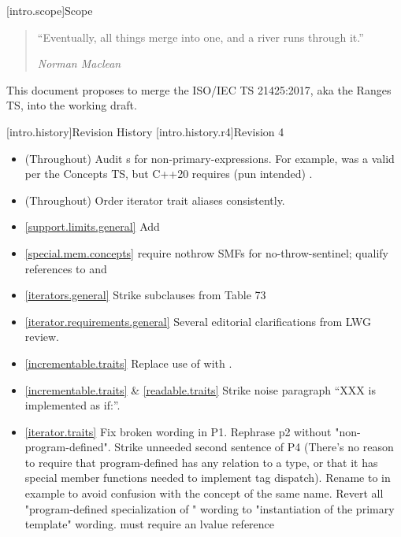 [intro.scope]{Scope}

\begin{quote}
``Eventually, all things merge into one, and a river runs through it.''
\begin{flushright}
\textemdash \textit{Norman Maclean}
\end{flushright}
\end{quote}

\pnum
This document proposes to merge the ISO/IEC TS 21425:2017, aka the Ranges TS,
into the working draft.

[intro.history]{Revision History}
[intro.history.r4]{Revision 4}
\begin{itemize}
\item (Throughout) Audit s for
  non-primary-expressions. For example,  was a valid
   per the Concepts TS, but C++20 requires
  (pun intended) .
\item (Throughout) Order iterator trait aliases consistently.
\item \ref{support.limits.general} Add 
\item \ref{special.mem.concepts} require nothrow SMFs for no-throw-sentinel;
  qualify references to  and 
\item \ref{iterators.general} Strike subclauses from Table 73
\item \ref{iterator.requirements.general} Several editorial clarifications from
  LWG review.
\item \ref{incrementable.traits} Replace use of  with
  .
\item \ref{incrementable.traits} \& \ref{readable.traits} Strike noise paragraph
  ``XXX is implemented as if:''.
\item \ref{iterator.traits} Fix broken wording in P1. Rephrase p2 without
  "non-program-defined". Strike unneeded second sentence of P4
  (There's no reason to require that program-defined 
  has any relation to a  type, or that it has special member
  functions needed to implement tag dispatch). Rename 
  to  in example to avoid confusion with the concept of the same name.
  Revert all "program-defined specialization of " wording
  to "instantiation of the primary template" wording.
   must require an lvalue reference

\end{itemize}

